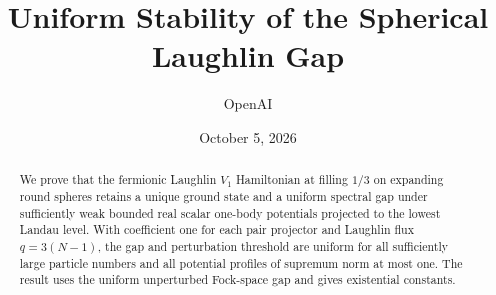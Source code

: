 \documentclass[11pt]{article}
\title{Uniform Stability of the Spherical Laughlin Gap}
\author{OpenAI}
\date{October 5, 2026}
\numberwithin{equation}{section}
\theoremstyle{definition}
\theoremstyle{remark}
\begin{document}
\maketitle
\begin{abstract}
We prove that the fermionic Laughlin $V_1$ Hamiltonian at filling $1/3$
on expanding round spheres retains a unique ground state and a uniform
spectral gap under sufficiently weak bounded real scalar one-body
potentials projected to the lowest Landau level. With coefficient one
for each pair projector and Laughlin flux $q=3(N-1)$, the gap and
perturbation threshold are uniform for all sufficiently large particle
numbers and all potential profiles of supremum norm at most one.
The result uses the uniform unperturbed Fock-space gap and gives
existential constants.
\end{abstract}
\tableofcontents








\appendix


\end{document}
